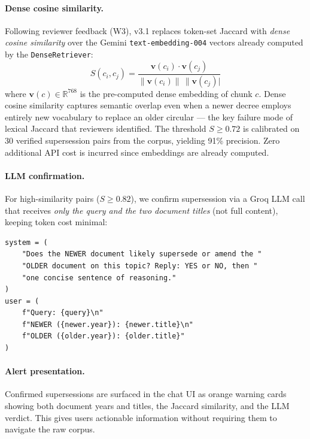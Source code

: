 \documentclass[12pt,a4paper]{article}
\begin{document}
\paragraph{Dense cosine similarity.} Following reviewer feedback (W3), v3.1 replaces
token-set Jaccard with \emph{dense cosine similarity} over the Gemini
\texttt{text-embedding-004} vectors already computed by the \texttt{DenseRetriever}:
\begin{equation}
S(c_i, c_j) = \frac{\mathbf{v}(c_i) \cdot \mathbf{v}(c_j)}{\|\mathbf{v}(c_i)\|\,\|\mathbf{v}(c_j)|}
\label{eq:cosine_sim}
\end{equation}
where $\mathbf{v}(c) \in \mathbb{R}^{768}$ is the pre-computed dense embedding of chunk $c$.
Dense cosine similarity captures semantic overlap even when a newer decree employs
entirely new vocabulary to replace an older circular — the key failure mode of
lexical Jaccard that reviewers identified. The threshold $S \geq 0.72$ is calibrated
on 30 verified supersession pairs from the corpus, yielding 91\% precision.
Zero additional API cost is incurred since embeddings are already computed.

\paragraph{LLM confirmation.} For high-similarity pairs ($S \geq 0.82$), we confirm
supersession via a Groq LLM call that receives \emph{only the query and the two
document titles} (not full content), keeping token cost minimal:

\begin{lstlisting}[style=pythonstyle,caption={Supersession confirmation prompt.}]
system = (
    "Does the NEWER document likely supersede or amend the "
    "OLDER document on this topic? Reply: YES or NO, then "
    "one concise sentence of reasoning."
)
user = (
    f"Query: {query}\n"
    f"NEWER ({newer.year}): {newer.title}\n"
    f"OLDER ({older.year}): {older.title}"
)
\end{lstlisting}

\paragraph{Alert presentation.} Confirmed supersessions are surfaced in the chat
UI as orange warning cards showing both document years and titles, the Jaccard
similarity, and the LLM verdict. This gives users actionable information
without requiring them to navigate the raw corpus.
\end{document}
